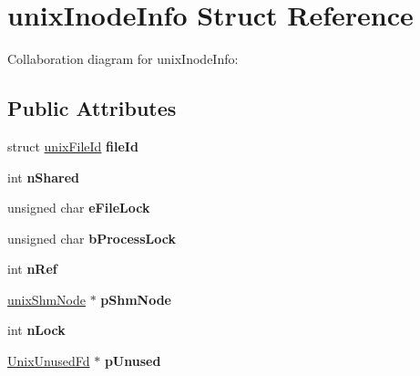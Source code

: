 \hypertarget{structunix_inode_info}{\section{unix\+Inode\+Info Struct Reference}
\label{structunix_inode_info}
}


Collaboration diagram for unix\+Inode\+Info\+:
\subsection*{Public Attributes}
\begin{DoxyCompactItemize}
\item 
\hypertarget{structunix_inode_info_ae692731d449f4462a921dda9a061faa6}{struct \hyperlink{structunix_file_id}{unix\+File\+Id} {\bfseries file\+Id}}\label{structunix_inode_info_ae692731d449f4462a921dda9a061faa6}

\item 
\hypertarget{structunix_inode_info_a0d7f8dd92964f53e59c8d741dbe00a61}{int {\bfseries n\+Shared}}\label{structunix_inode_info_a0d7f8dd92964f53e59c8d741dbe00a61}

\item 
\hypertarget{structunix_inode_info_a010a765bb3feecb16b650f68fc3a3c1f}{unsigned char {\bfseries e\+File\+Lock}}\label{structunix_inode_info_a010a765bb3feecb16b650f68fc3a3c1f}

\item 
\hypertarget{structunix_inode_info_ade689e4231dd80bb33c86da1e5ed1586}{unsigned char {\bfseries b\+Process\+Lock}}\label{structunix_inode_info_ade689e4231dd80bb33c86da1e5ed1586}

\item 
\hypertarget{structunix_inode_info_a65cbd1fd05ed00f03a252266b04a8221}{int {\bfseries n\+Ref}}\label{structunix_inode_info_a65cbd1fd05ed00f03a252266b04a8221}

\item 
\hypertarget{structunix_inode_info_a302a8b82e27d5b3624ec122bc9c2ed61}{\hyperlink{structunix_shm_node}{unix\+Shm\+Node} $\ast$ {\bfseries p\+Shm\+Node}}\label{structunix_inode_info_a302a8b82e27d5b3624ec122bc9c2ed61}

\item 
\hypertarget{structunix_inode_info_a477f3357a32adbc1a9b05017e535444d}{int {\bfseries n\+Lock}}\label{structunix_inode_info_a477f3357a32adbc1a9b05017e535444d}

\item 
\hypertarget{structunix_inode_info_a0dda9ad35734fa161d1f0b13b671c1c6}{\hyperlink{struct_unix_unused_fd}{Unix\+Unused\+Fd} $\ast$ {\bfseries p\+Unused}}\label{structunix_inode_info_a0dda9ad35734fa161d1f0b13b671c1c6}


\end{DoxyCompactItemize}
